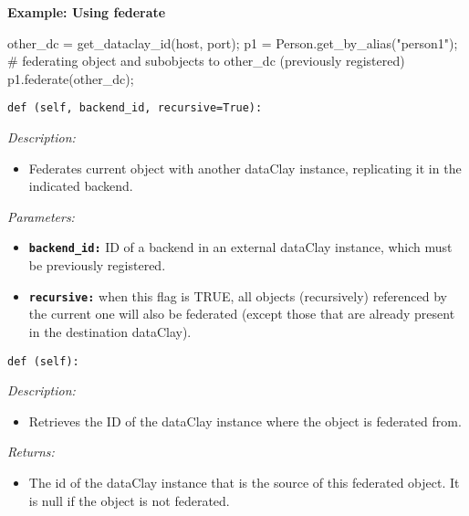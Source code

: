 \begin{tBox}
\textcolor{basecolor} {\bf Example: Using federate}
\begin{python}
  other_dc = get_dataclay_id(host, port);
  p1 = Person.get_by_alias("person1");
  # federating object and subobjects to other_dc (previously registered)
  p1.federate(other_dc);
\end{python}
\end{tBox}

\begin{dBox}
\texttt{def (self, backend\_id, recursive=True):}
\LINE

{\it Description:}

\begin{itemize}
  \item Federates current object with another dataClay instance, replicating it in the indicated backend.
\end{itemize}

{\it Parameters:}

\begin{itemize}
  \item \texttt{\bfseries backend\_id:} ID of a backend in an external dataClay instance, which must be previously registered.
  \item \texttt{\bfseries recursive:} when this flag is TRUE, all objects (recursively) referenced by the current one will also be federated (except those that are already present in the destination dataClay). 
\end{itemize}
\end{dBox}


\begin{dBox}
\texttt{def (self):}
\LINE

{\it Description:}

\begin{itemize}
 \item Retrieves the ID of the dataClay instance where the object is federated from. 
\end{itemize}

{\it Returns:}

\begin{itemize}
 \item The id of the dataClay instance that is the source of this federated object.  
 It is null if the object is not federated.
\end{itemize}

\end{dBox}

